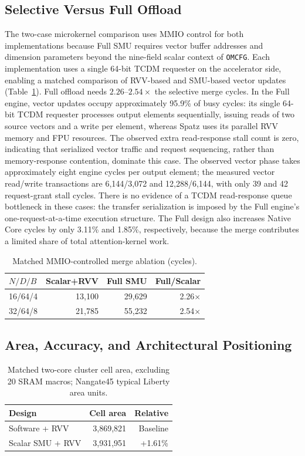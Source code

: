 \documentclass[journal]{IEEEtran}
\begin{document}
\subsection{Selective Versus Full Offload}
The two-case microkernel comparison uses MMIO control for both
implementations because Full SMU requires vector buffer addresses and
dimension parameters beyond the nine-field scalar context of \texttt{OMCFG}.
Each implementation uses a single 64-bit TCDM requester on the accelerator
side, enabling a matched comparison of RVV-based and SMU-based vector
updates (Table~\ref{tab:full}). Full offload needs
$2.26$--$2.54\times$ the selective merge cycles. In the Full engine,
vector updates occupy approximately 95.9\% of busy cycles: its single
64-bit TCDM requester processes output elements sequentially, issuing
reads of two source vectors and a write per element, whereas Spatz uses its
parallel RVV memory and FPU resources. The observed extra read-response
stall count is zero, indicating that serialized vector traffic and request
sequencing, rather than memory-response contention, dominate this case.
The observed vector phase takes approximately eight engine cycles per
output element; the measured vector read/write transactions are
6,144/3,072 and 12,288/6,144, with only 39 and 42 request-grant stall
cycles. There is no evidence of a TCDM read-response queue bottleneck in
these cases: the transfer serialization is imposed by the Full engine's
one-request-at-a-time execution structure. The Full design also increases Native Core cycles by only
3.11\% and 1.85\%, respectively, because the merge contributes a limited
share of total attention-kernel work.

\begin{table}[t]
\centering
\caption{Matched MMIO-controlled merge ablation (cycles).}
\label{tab:full}
\small
\begin{tabular}{@{}lrrr@{}}
\toprule
$N/D/B$ & Scalar+RVV & Full SMU & Full/Scalar\\
\midrule
16/64/4 & 13,100 & 29,629 & 2.26$\times$\\
32/64/8 & 21,785 & 55,232 & 2.54$\times$\\
\bottomrule
\end{tabular}
\end{table}

\subsection{Area, Accuracy, and Architectural Positioning}
\begin{table}[t]
\centering
\caption{Matched two-core cluster cell area, excluding 20 SRAM macros;
Nangate45 typical Liberty area units.}
\label{tab:area}
\small
\begin{tabular}{@{}lrr@{}}
\toprule
Design & Cell area & Relative\\
\midrule
Software + RVV & 3,869,821 & Baseline\\
Scalar SMU + RVV & 3,931,951 & +1.61\%\\
\bottomrule
\end{tabular}
\end{table}
\end{document}
